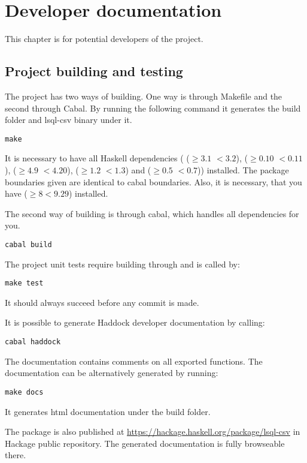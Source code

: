 \chapter{Developer documentation}
This chapter is for potential developers of the project.

\section{Project building and testing}
The project has two ways of building. One way is through Makefile and the second through Cabal. 
By running the following command it generates the build folder and lsql-csv binary under it.
\begin{verbatim}
make
\end{verbatim}
 
It is necessary to have all Haskell dependencies ( ($\geq 3.1$ $<3.2$),  ($\geq 0.10$ $<0.11$), 
 ($\geq 4.9$ $<4.20$),  ($\geq 1.2$ $<1.3$) and  ($\geq 0.5$ $<0.7$)) installed.
The package boundaries given are identical to cabal boundaries. Also, it is necessary, that you have  ($\geq 8 <9.29$) installed.

The second way of building is through cabal, which handles all dependencies for you.

\begin{verbatim}
cabal build
\end{verbatim}


The project unit tests require building through  and is called by:
\begin{verbatim}
make test
\end{verbatim}
It should always succeed before any commit is made.

It is possible to generate Haddock developer documentation by calling:
\begin{verbatim}
cabal haddock
\end{verbatim}

The documentation contains comments on all exported functions. The documentation can be alternatively generated
by running:

\begin{verbatim}
make docs
\end{verbatim}
It generates html documentation under the build folder.

The package is also published at \url{https://hackage.haskell.org/package/lsql-csv} in Hackage public repository. 
The generated documentation is fully browseable there.

